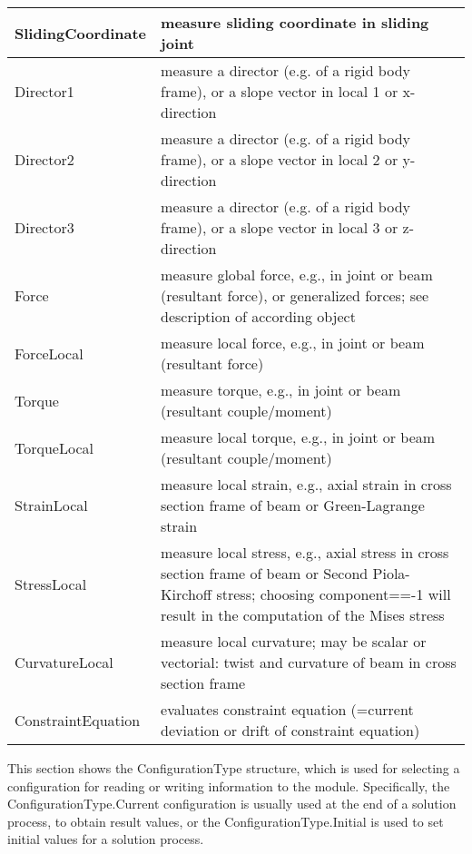 \begin{center}
\begin{longtable}{| p{8cm} | p{8cm} |}
  SlidingCoordinate & measure sliding coordinate in sliding joint\\ \hline  
  Director1 & measure a director (e.g. of a rigid body frame), or a slope vector in local 1 or x-direction\\ \hline  
  Director2 & measure a director (e.g. of a rigid body frame), or a slope vector in local 2 or y-direction\\ \hline  
  Director3 & measure a director (e.g. of a rigid body frame), or a slope vector in local 3 or z-direction\\ \hline  
  Force & measure global force, e.g., in joint or beam (resultant force), or generalized forces; see description of according object\\ \hline  
  ForceLocal & measure local force, e.g., in joint or beam (resultant force)\\ \hline  
  Torque & measure torque, e.g., in joint or beam (resultant couple/moment)\\ \hline  
  TorqueLocal & measure local torque, e.g., in joint or beam (resultant couple/moment)\\ \hline  
  StrainLocal & measure local strain, e.g., axial strain in cross section frame of beam or Green-Lagrange strain\\ \hline  
  StressLocal & measure local stress, e.g., axial stress in cross section frame of beam or Second Piola-Kirchoff stress; choosing component==-1 will result in the computation of the Mises stress\\ \hline  
  CurvatureLocal & measure local curvature; may be scalar or vectorial: twist and curvature of beam in cross section frame\\ \hline  
  ConstraintEquation & evaluates constraint equation (=current deviation or drift of constraint equation)\\ \hline  
\end{longtable}
\end{center}

\label{sec:ConfigurationType}
This section shows the ConfigurationType structure, which is used for selecting a configuration for reading or writing information to the module. Specifically, the ConfigurationType.Current configuration is usually used at the end of a solution process, to obtain result values, or the ConfigurationType.Initial is used to set initial values for a solution process.



